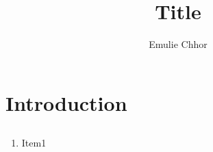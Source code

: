 \documentclass{article}
\begin{document}
\title{Title}
\author{Emulie Chhor}
\maketitle

\section{Introduction}

\subsection{}

    \begin{enumerate}
	\item Item1
    \end{enumerate}

\newtheorem{definition}{Definition}[subsection]
\newtheorem{theorem}{Theorem}[subsection]
\newtheorem{corollary}{Corollary}[subsection]
\newtheorem{lemma}[theorem]{Lemma}
\newtheorem*{remark}{Remark}
\end{document}

